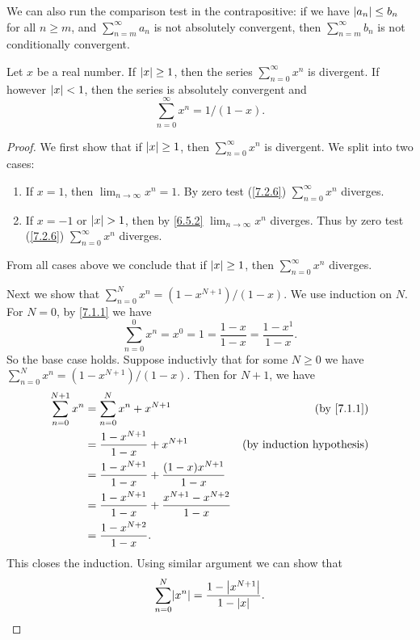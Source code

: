 \begin{note}
  We can also run the comparison test in the contrapositive:
  if we have \(\left\lvert a_n\right\rvert \leq b_n\) for all \(n \geq m\), and \(\sum_{n = m}^\infty a_n\) is not absolutely convergent, then \(\sum_{n = m}^\infty b_n\) is not conditionally convergent.
\end{note}

\begin{lemma}\label{7.3.3}
  Let \(x\) be a real number.
  If \(\left\lvert x\right\rvert \geq 1\), then the series \(\sum_{n = 0}^\infty x^n\) is divergent.
  If however \(\left\lvert x\right\rvert < 1\), then the series is absolutely convergent and
  \[
    \sum_{n = 0}^\infty x^n = 1 / (1 - x).
  \]
\end{lemma}

\begin{proof}
  We first show that if \(\left\lvert x\right\rvert \geq 1\), then \(\sum_{n = 0}^\infty x^n\) is divergent.
  We split into two cases:
  \begin{enumerate}
    \item If \(x = 1\), then \(\lim_{n \to \infty} x^n = 1\). By zero test (\cref{7.2.6}) \(\sum_{n = 0}^\infty x^n\) diverges.
    \item If \(x = -1\) or \(\left\lvert x\right\rvert > 1\), then by \cref{6.5.2} \(\lim_{n \to \infty} x^n\) diverges.
          Thus by zero test (\cref{7.2.6}) \(\sum_{n = 0}^\infty x^n\) diverges.
  \end{enumerate}
  From all cases above we conclude that if \(\left\lvert x\right\rvert \geq 1\), then \(\sum_{n = 0}^\infty x^n\) diverges.

  Next we show that \(\sum_{n = 0}^N x^n = (1 - x^{N + 1}) / (1 - x)\).
  We use induction on \(N\).
  For \(N = 0\), by \cref{7.1.1} we have
  \[
    \sum_{n = 0}^0 x^n = x^0 = 1 = \frac{1 - x}{1 - x} = \frac{1 - x^1}{1 - x}.
  \]
  So the base case holds.
  Suppose inductivly that for some \(N \geq 0\) we have \(\sum_{n = 0}^N x^n = (1 - x^{N + 1}) / (1 - x)\).
  Then for \(N + 1\), we have
  \begin{align*}
    \sum_{n = 0}^{N + 1} x^n & = \sum_{n = 0}^N x^n + x^{N + 1}                                    & \text{(by \cref{7.1.1})}         \\
                             & = \frac{1 - x^{N + 1}}{1 - x} + x^{N + 1}                           & \text{(by induction hypothesis)} \\
                             & = \frac{1 - x^{N + 1}}{1 - x} + \frac{(1 - x) x^{N + 1}}{1 - x}                                        \\
                             & = \frac{1 - x^{N + 1}}{1 - x} + \frac{x^{N + 1} - x^{N + 2}}{1 - x}                                    \\
                             & = \frac{1 - x^{N + 2}}{1 - x}.
  \end{align*}
  This closes the induction.
  Using similar argument we can show that
  \[
    \sum_{n = 0}^N \abs{x^n} = \frac{1 - \abs{x^{N + 1}}}{1 - \abs{x}}.
  \]


\end{proof}
